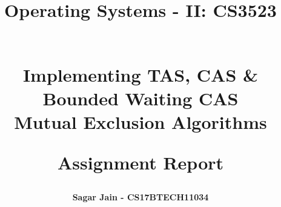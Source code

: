 \documentclass[a4paper,12pt]{report}
\begin{document}
\title{
\textbf{Operating Systems - II: CS3523}\\~\\
\begin{large}
\textbf{Implementing TAS, CAS \& Bounded Waiting CAS\\
Mutual Exclusion Algorithms\\}
\end{large}
\begin{large}
\textbf{Assignment Report}
\end{large}
}
\author{\textbf{Sagar Jain - CS17BTECH11034}\\}
\maketitle
\begin{large}
\tableofcontents
\end{large}
\newpage
\end{document}
